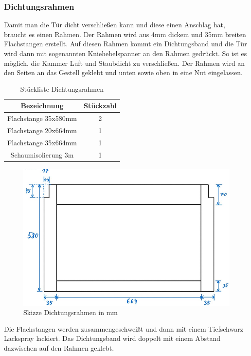 
\subsubsection{Dichtungsrahmen}
Damit man die Tür dicht verschließen kann und diese einen Anschlag hat, braucht es einen Rahmen. Der Rahmen wird aus 4mm dickem und 35mm breiten Flachstangen erstellt. Auf diesen Rahmen kommt ein Dichtungsband und die Tür wird dann mit sogenannten Kniehebelspanner an den Rahmen gedrückt. So ist es möglich, die Kammer Luft und Staubdicht zu verschließen. Der Rahmen wird an den Seiten an das Gestell geklebt und unten sowie oben in eine Nut eingelassen.
\vspace{5mm}
\begin{table}[H]
    \centering
    \begin{tabular}{ | c | c | } 
  \hline
   \textbf{Bezeichnung} & \textbf{Stückzahl}\\ 
  \hline
   Flachstange 35x580mm & 2\\ 
  \hline
   Flachstange 20x664mm & 1 \\ 
  \hline
  Flachstange 35x664mm & 1 \\ 
  \hline
  Schaumisolierung 3m & 1 \\ 
  \hline
\end{tabular}
    \caption{Stückliste Dichtungsrahmen}
\end{table}
\vspace{5mm}
\begin{figure}[H]
    \centering
    \includegraphics[scale=1.2]{image/skizzerahmen.png}
    \caption{Skizze Dichtungsrahmen in mm}
    \label{fig:enter-label}
\end{figure}
Die Flachstangen werden zusammengeschweißt und dann mit einem Tiefschwarz Lackspray lackiert. Das Dichtungsband wird doppelt mit einem Abstand dazwischen auf den Rahmen geklebt. \\
